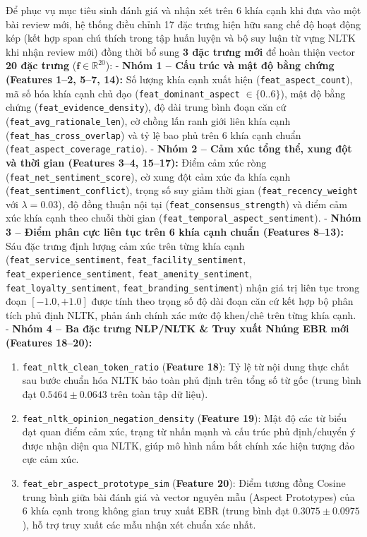 \documentclass[pdflatex,sn-mathphys-num]{sn-jnl}
\theoremstyle{thmstyleone}
\theoremstyle{thmstyletwo}
\theoremstyle{thmstylethree}
\begin{document}
Để phục vụ mục tiêu sinh đánh giá và nhận xét trên 6 khía cạnh khi đưa vào một bài review mới, hệ thống điều chỉnh 17 đặc trưng hiện hữu sang chế độ hoạt động kép (kết hợp span chú thích trong tập huấn luyện và bộ suy luận từ vựng NLTK khi nhận review mới) đồng thời bổ sung \textbf{3 đặc trưng mới} để hoàn thiện vector \textbf{20 đặc trưng} ($\mathbf{f} \in \mathbb{R}^{20}$):
- \textbf{Nhóm 1 -- Cấu trúc và mật độ bằng chứng (Features 1--2, 5--7, 14):} Số lượng khía cạnh xuất hiện (\texttt{feat\_aspect\_count}), mã số hóa khía cạnh chủ đạo (\texttt{feat\_dominant\_aspect} $\in \{0..6\}$), mật độ bằng chứng (\texttt{feat\_evidence\_density}), độ dài trung bình đoạn căn cứ (\texttt{feat\_avg\_rationale\_len}), cờ chồng lấn ranh giới liên khía cạnh (\texttt{feat\_has\_cross\_overlap}) và tỷ lệ bao phủ trên 6 khía cạnh chuẩn (\texttt{feat\_aspect\_coverage\_ratio}).
- \textbf{Nhóm 2 -- Cảm xúc tổng thể, xung đột và thời gian (Features 3--4, 15--17):} Điểm cảm xúc ròng (\texttt{feat\_net\_sentiment\_score}), cờ xung đột cảm xúc đa khía cạnh (\texttt{feat\_sentiment\_conflict}), trọng số suy giảm thời gian (\texttt{feat\_recency\_weight} với $\lambda = 0.03$), độ đồng thuận nội tại (\texttt{feat\_consensus\_strength}) và điểm cảm xúc khía cạnh theo chuỗi thời gian (\texttt{feat\_temporal\_aspect\_sentiment}).
- \textbf{Nhóm 3 -- Điểm phân cực liên tục trên 6 khía cạnh chuẩn (Features 8--13):} Sáu đặc trưng định lượng cảm xúc trên từng khía cạnh (\texttt{feat\_service\_sentiment}, \texttt{feat\_facility\_sentiment}, \texttt{feat\_experience\_sentiment}, \texttt{feat\_amenity\_sentiment}, \texttt{feat\_loyalty\_sentiment}, \texttt{feat\_branding\_sentiment}) nhận giá trị liên tục trong đoạn $[-1.0, +1.0]$ được tính theo trọng số độ dài đoạn căn cứ kết hợp bộ phân tích phủ định NLTK, phản ánh chính xác mức độ khen/chê trên từng khía cạnh.
- \textbf{Nhóm 4 -- Ba đặc trưng NLP/NLTK \& Truy xuất Nhúng EBR mới (Features 18--20):}
  \begin{enumerate}
      \item \texttt{feat\_nltk\_clean\_token\_ratio} (\textbf{Feature 18}): Tỷ lệ từ nội dung thực chất sau bước chuẩn hóa NLTK bảo toàn phủ định trên tổng số từ gốc (trung bình đạt $0.5464 \pm 0.0643$ trên toàn tập dữ liệu).
      \item \texttt{feat\_nltk\_opinion\_negation\_density} (\textbf{Feature 19}): Mật độ các từ biểu đạt quan điểm cảm xúc, trạng từ nhấn mạnh và cấu trúc phủ định/chuyển ý được nhận diện qua NLTK, giúp mô hình nắm bắt chính xác hiện tượng đảo cực cảm xúc.
      \item \texttt{feat\_ebr\_aspect\_prototype\_sim} (\textbf{Feature 20}): Điểm tương đồng Cosine trung bình giữa bài đánh giá và vector nguyên mẫu (Aspect Prototypes) của 6 khía cạnh trong không gian truy xuất EBR (trung bình đạt $0.3075 \pm 0.0975$), hỗ trợ truy xuất các mẫu nhận xét chuẩn xác nhất.
  \end{enumerate}
\end{document}

